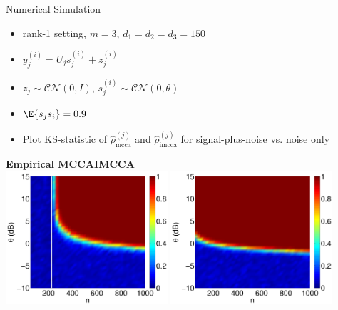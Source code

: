 \documentclass[8pt]{beamer}
\begin{document}
\begin{frame}{Numerical Simulation}

  \begin{itemize}
  \item rank-1 setting, $m=3$, $d_1=d_2=d_3=150$
  \item $y_j^{(i)}=U_js_j^{(i)} + z_j^{(i)}$
  \item $z_j\sim\mathcal{CN}(0,I)$, $s_j^{(i)} \sim \mathcal{CN}(0,\theta)$
  \item $\E{s_js_i} = 0.9$
  \item Plot KS-statistic of $\widehat{\rho}^{(j)}_{\text{mcca}}$ and
    $\widehat{\rho}^{(j)}_{\text{imcca}}$ for signal-plus-noise vs. noise only
  \end{itemize}

  \vspace{2ex}

  \begin{center}
    \hspace{-3ex}\textbf{Empirical MCCA}\hspace{25ex}\textbf{IMCCA}\\
    \includegraphics[width=0.45\textwidth]{figures/mcca_pt.pdf}\hspace{2ex}
    \includegraphics[width=0.45\textwidth]{figures/imcca_pt.pdf}

  \end{center}


\end{frame}
\end{document}
